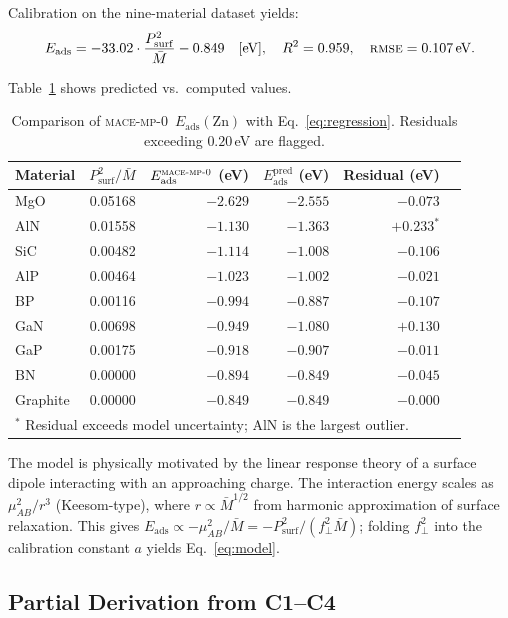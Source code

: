 \documentclass[11pt,a4paper]{article}
\newcommand{\Eads}{E_{\mathrm{ads}}}
\newcommand{\Psurf}{P_{\mathrm{surf}}}
\newcommand{\Mmoy}{\bar{M}}
\newcommand{\muAB}{\mu_{AB}}
\newcommand{\fracZ}{f_{\perp}}
\newcommand{\MACE}{\textsc{mace-mp-0}}
\newcommand{\RMS}{\textsc{rmse}}
\begin{document}
Calibration on the nine-material dataset yields:
\begin{equation}
\Eads = -33.02 \cdot \frac{\Psurf^2}{\Mmoy} - 0.849 \quad [\text{eV}],
\quad R^2 = 0.959, \quad \RMS = 0.107\,\text{eV}.
\label{eq:regression}
\end{equation}

Table~\ref{tab:regression} shows predicted vs.\ computed values.

\begin{table}[ht]
\centering
\caption{Comparison of \MACE\ $\Eads(\mathrm{Zn})$ with Eq.~\eqref{eq:regression}. Residuals exceeding $0.20$\,eV are flagged.}
\label{tab:regression}
\begin{tabular}{lrrrrr}
\toprule
Material & $\Psurf^2/\Mmoy$ & $\Eads^{\MACE}$ (eV) & $\Eads^{\mathrm{pred}}$ (eV) & Residual (eV) \\
\midrule
MgO      & 0.05168 & $-2.629$ & $-2.555$ & $-0.073$ \\
AlN      & 0.01558 & $-1.130$ & $-1.363$ & $+0.233^*$ \\
SiC      & 0.00482 & $-1.114$ & $-1.008$ & $-0.106$ \\
AlP      & 0.00464 & $-1.023$ & $-1.002$ & $-0.021$ \\
BP       & 0.00116 & $-0.994$ & $-0.887$ & $-0.107$ \\
GaN      & 0.00698 & $-0.949$ & $-1.080$ & $+0.130$ \\
GaP      & 0.00175 & $-0.918$ & $-0.907$ & $-0.011$ \\
BN       & 0.00000 & $-0.894$ & $-0.849$ & $-0.045$ \\
Graphite & 0.00000 & $-0.849$ & $-0.849$ & $-0.000$ \\
\bottomrule
\multicolumn{5}{l}{$^*$ Residual exceeds model uncertainty; AlN is the largest outlier.}
\end{tabular}
\end{table}

\begin{remark}
The model is physically motivated by the linear response theory of a surface dipole interacting with an approaching charge. The interaction energy scales as $\muAB^2 / r^3$ (Keesom-type), where $r \propto \Mmoy^{1/2}$ from harmonic approximation of surface relaxation. This gives $\Eads \propto -\muAB^2 / \Mmoy = -\Psurf^2 / (\fracZ^2 \Mmoy)$; folding $\fracZ^2$ into the calibration constant $a$ yields Eq.~\eqref{eq:model}.
\end{remark}

\subsection{Partial Derivation from C1--C4}
\end{document}

